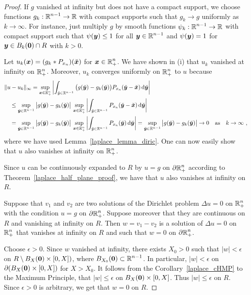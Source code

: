 \begin{proof}
 If $g$ vanished at infinity but does not have a compact
support, we choose functions $\displaystyle g_k:\mathbb{R}^{n-1}\to \mathbb{R}$ with
compact supports such that $g_k \to g$ uniformly as $k \to \infty$.
For instance, just multiply $g$ by smooth functions
$\displaystyle \psi_k:\mathbb{R}^{n-1}\to \mathbb{R}$ with compact support such that
$\psi({\bm{y}}) \leq 1$ for all $\displaystyle {\bm{y}} \in \mathbb{R}^{n-1}$ and
$\psi({\bm{y}}) =1$ for ${\bm{y}} \in B_k({\bm{0}}) \cap R$ with $k>0$.

Let $u_k({\bm{x}}) = (g_k \ast P_{x_n})(\breve{{\bm{x}}})$ for
$\displaystyle {\bm{x}} \in \mathbb{R}^n_+$.  We have shown in (i) that $u_k$
vanished at infinity on $\displaystyle \mathbb{R}^n_+$.  Moreover, $u_k$
converges uniformly on $\displaystyle \mathbb{R}^n_+$ to $u$ because
\begin{align*}
&\| u - u_k \|_\infty = \sup_{{\bm{x}}\in\mathbb{R}^n_+} 
\left| \int_{\breve{y} \in \mathbb{R}^{n-1}}
\big(g(\breve{{\bm{y}}}) - g_k(\breve{{\bm{y}}}) \big)
P_{x_n}(\breve{{\bm{y}}}-\breve{{\bm{x}}}) \,\mathrm{d}{\breve{{\bm{y}}}} \right| \\
&\quad \leq \sup_{\breve{{\bm{y}}}\in \mathbb{R}^{n-1}}
\big|g(\breve{{\bm{y}}}) - g_k(\breve{{\bm{y}}}) \big|
\, \sup_{{\bm{x}}\in\mathbb{R}^n_+} \left| \int_{\breve{y} \in \mathbb{R}^{n-1}}
P_{x_n}(\breve{{\bm{y}}}-\breve{{\bm{x}}}) \,\mathrm{d}{\breve{{\bm{y}}}}\right| \\
&\quad = \sup_{\breve{{\bm{y}}}\in \mathbb{R}^{n-1}}
\big|g(\breve{{\bm{y}}}) - g_k(\breve{{\bm{y}}}) \big|
\, \sup_{{\bm{x}}\in\mathbb{R}^n_+} \left| \int_{\breve{y} \in \mathbb{R}^{n-1}}
P_{x_n}(\breve{{\bm{y}}}) \,\mathrm{d}{\breve{{\bm{y}}}}\right|
= \sup_{\breve{{\bm{y}}}\in \mathbb{R}^{n-1}}
\big|g(\breve{{\bm{y}}}) - g_k(\breve{{\bm{y}}}) \big| \to 0 \quad
\text{as} \quad k \to \infty \ ,
\end{align*}
where we have used Lemma~\ref{laplace_lemma_diric}.
One can now easily show that $u$ also vanishes at infinity on
$\displaystyle \mathbb{R}^n_+$.

Since $u$ can be continuously expanded to
$R$ by $u=g$ on $\displaystyle \partial \mathbb{R}^n_+$
according to Theorem~\ref{laplace_half_plane_proof}, we
have that $u$ also vanishes at infinity on $R$.

  Suppose that $v_1$ and $v_2$ are two solutions of the
Dirichlet problem $\Delta u=0$ on $\displaystyle \mathbb{R}^n_+$ with the
condition $u=g$ on $\displaystyle \partial \mathbb{R}^n_+$.  Suppose moreover
that they are continuous on $R$ and vanishing at infinity on $R$.
Then $w = v_1-v_2$ is a solution of $\Delta u=0$ on
$\displaystyle \mathbb{R}^n_+$ that vanishes at infinity on
$R$ and such that $w=0$ on $\displaystyle \partial \mathbb{R}^n_+$.

Choose $\epsilon >0$.  Since $w$ vanished at infinity, there exists
$X_0 >0$ such that $|w| < \epsilon$ on
$R \setminus B_X({\bm{0}}) \times [0,X])$, where
$\displaystyle B_{X_0}({\bm{0}}) \subset \mathbb{R}^{n-1}$. 
In particular, $|w| < \epsilon$ on $\partial (B_X({\bm{0}}) \times [0,X])$
for $X > X_0$.  It follows from the Corollary~\ref{laplace_cHMP} to
the Maximum Principle, that
$|w| \leq \epsilon$ on $B_X({\bm{0}}) \times [0,X]$.
Thus $|w| \leq \epsilon$ on $R$.
Since $\epsilon > 0$ is arbitrary, we get that $w=0$ on $R$.
\end{proof}

